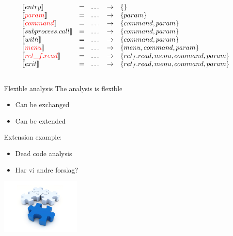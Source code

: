 \begin{frame}
  \[
\begin{array}{lclcl}
  \llbracket entry \rrbracket & = & \dots & \rightarrow & {\{\}}\\
  \llbracket {\color{red}param} \rrbracket & = & \dots & \rightarrow & \{param\} \\ 
  \llbracket {\color{red}command} \rrbracket & = & \dots & \rightarrow & \{command, param\}\\
  \llbracket subprocess.call \rrbracket & = & \dots & \rightarrow & \{command, param\}\\
  \llbracket with \rrbracket & = & \dots & \rightarrow & \{command, param\} \\
  \llbracket {\color{red}menu} \rrbracket & = & \dots & \rightarrow & \{menu, command, param\}\\
  \llbracket {\color{red}ret\_f.read} \rrbracket & = & \dots & \rightarrow & \{ret_f.read, menu, command, param\}\\
  \llbracket exit \rrbracket & = & \dots & \rightarrow & \{ret_f.read, menu, command, param\}\\
  &&&&
\end{array}
\]
\end{frame}

\begin{frame}{Flexible analysis}
  The analysis is flexible
  \begin{itemize}
    \item Can be exchanged
    \item Can be extended
  \end{itemize}

 Extension example:
  \begin{itemize}
    \item Dead code analysis
    \item Har vi andre forslag?
  \end{itemize}
  \center
  \includegraphics[width=0.3\textwidth]{graphics/modular}
\end{frame}

